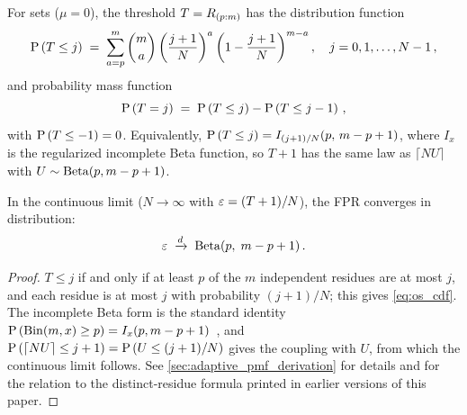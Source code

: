 \begin{theorem}
\label{thm:fpr_distribution}
For sets ($\mu = 0$), the threshold $T = R_{(p:m)}$ has the distribution
function
\begin{equation}
\label{eq:os_cdf}
    \Prob{T \leq j}
    \;=\; \sum_{a=p}^{m} \binom{m}{a}
    \left(\frac{j+1}{N}\right)^{a}\left(1 - \frac{j+1}{N}\right)^{m-a},
    \quad j = 0, 1, \ldots, N-1\,,
\end{equation}
and probability mass function
\begin{equation}
\label{eq:os_pmf}
    \Prob{T = j} \;=\; \Prob{T \leq j} - \Prob{T \leq j-1}\,,
\end{equation}
with $\Prob{T \leq -1} = 0$.
Equivalently, $\Prob{T \leq j} = I_{(j+1)/N}(p,\, m - p + 1)$, where $I_x$ is
the regularized incomplete Beta function, so $T + 1$ has the same law as
$\lceil N U \rceil$ with $U \sim \operatorname{Beta}(p, m - p + 1)$.

In the continuous limit ($N \to \infty$ with $\varepsilon = (T+1)/N$), the FPR
converges in distribution:
\begin{equation}
\label{eq:fpr_beta}
    \varepsilon \;\xrightarrow{d}\; \operatorname{Beta}(p,\; m - p + 1)\,.
\end{equation}
\end{theorem}
\begin{proof}
$T \leq j$ if and only if at least $p$ of the $m$ independent residues are at
most $j$, and each residue is at most $j$ with probability $(j+1)/N$; this
gives \cref{eq:os_cdf}.
The incomplete Beta form is the standard identity
$\Prob{\bindist(m, x) \geq p} = I_x(p, m-p+1)$~\cite{order_statistics}, and
$\Prob{\lceil N U \rceil \leq j+1} = \Prob{U \leq (j+1)/N}$ gives the
coupling with $U$, from which the continuous limit follows.
See \cref{sec:adaptive_pmf_derivation} for details and for the relation to
the distinct-residue formula printed in earlier versions of this paper.
\end{proof}

